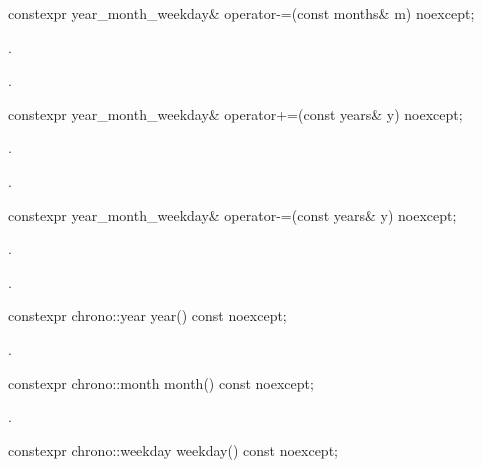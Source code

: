 %
\begin{itemdecl}
constexpr year_month_weekday& operator-=(const months& m) noexcept;
\end{itemdecl}

\begin{itemdescr}
\pnum
\effects
{}.

\pnum
\returns
{}.
\end{itemdescr}

%
\begin{itemdecl}
constexpr year_month_weekday& operator+=(const years& y) noexcept;
\end{itemdecl}

\begin{itemdescr}
\pnum
\effects
{}.

\pnum
\returns
{}.
\end{itemdescr}

%
\begin{itemdecl}
constexpr year_month_weekday& operator-=(const years& y) noexcept;
\end{itemdecl}

\begin{itemdescr}
\pnum
\effects
{}.

\pnum
\returns
{}.
\end{itemdescr}

%
\begin{itemdecl}
constexpr chrono::year year() const noexcept;
\end{itemdecl}

\begin{itemdescr}
\pnum
\returns
{}.
\end{itemdescr}

%
\begin{itemdecl}
constexpr chrono::month month() const noexcept;
\end{itemdecl}

\begin{itemdescr}
\pnum
\returns
{}.
\end{itemdescr}

%
\begin{itemdecl}
constexpr chrono::weekday weekday() const noexcept;
\end{itemdecl}


